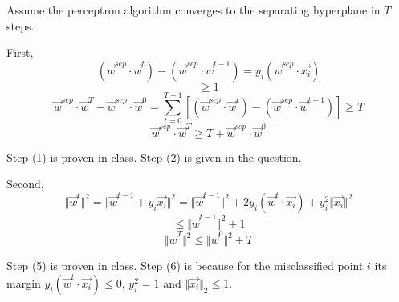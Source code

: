 \documentclass[paper=letter, fontsize=12pt]{article}
\begin{document}
\begin{enumerate}
Assume the perceptron algorithm converges to the separating hyperplane in $T$ steps.

First, 
\begin{equation}
(\vec{w}^{sep} \cdot \vec{w}^{t}) - (\vec{w}^{sep} \cdot \vec{w}^{t-1}) = y_i (\vec{w}^{sep} \cdot \vec{x_i})
\end{equation}
\begin{equation}
\geq 1
\end{equation}
\begin{equation}
\vec{w}^{sep} \cdot \vec{w}^{T} - \vec{w}^{sep} \cdot \vec{w}^{0} = \sum_{t=0}^{T-1} [(\vec{w}^{sep} \cdot \vec{w}^{t}) - (\vec{w}^{sep} \cdot \vec{w}^{t-1})] \geq T
\end{equation}
\begin{equation}
\vec{w}^{sep} \cdot\vec{w}^{T} \geq T + \vec{w}^{sep} \cdot \vec{w}^{0}
\end{equation}

Step (1) is proven in class. Step (2) is given in the question.

Second,
\begin{equation}
\Vert \vec{w}^{t} \Vert^2 = \Vert \vec{w}^{t-1} + y_i \vec{x_i} \Vert^2 = \Vert \vec{w}^{t-1} \Vert^2 + 2y_i(\vec{w}^t \cdot \vec{x_i}) + y_i^2 \Vert \vec{x_i} \Vert^2
\end{equation}
\begin{equation}
\leq \Vert \vec{w}^{t-1} \Vert^2 + 1
\end{equation}
\begin{equation}
\Vert \vec{w}^{T} \Vert^2 \leq \Vert \vec{w}^{0} \Vert^2 + T
\end{equation}

Step (5) is proven in class. Step (6) is because for the misclassified point $i$ its margin $y_i(\vec{w}^t \cdot \vec{x_i}) \leq 0$, $y_i^2 = 1$ and $\Vert \vec{x_i} \Vert_2 \leq 1$.


\end{enumerate}
\end{document}
